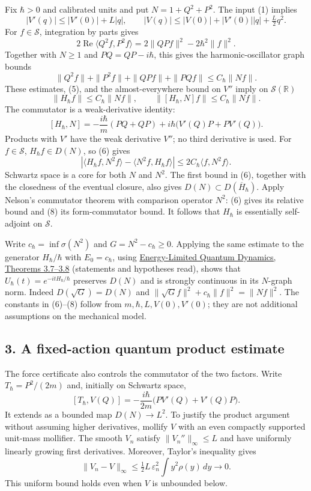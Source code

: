 \documentclass[11pt,a4paper]{article}
\begin{document}
Fix \(\hbar>0\) and calibrated units and put \(N=1+Q^2+P^2\). The input
(1) implies \[
 |V'(q)|\le |V'(0)|+L|q|,\qquad
 |V(q)|\le |V(0)|+|V'(0)||q|+\tfrac L2q^2.\tag{5}
\] For \(f\in\mathcal S\), integration by parts gives \[
 2\operatorname{Re}\langle Q^2f,P^2f\rangle
  =2\|QPf\|^2-2\hbar^2\|f\|^2.\tag{5a}
\] Together with \(N\ge1\) and \(PQ=QP-i\hbar\), this gives the
harmonic-oscillator graph bounds \[
 \|Q^2f\|+\|P^2f\|+\|QPf\|+\|PQf\|
 \le C_\hbar\|Nf\|.\tag{5b}
\] These estimates, (5), and the almost-everywhere bound on \(V''\)
imply on \(\mathcal S(\mathbb R)\) \[
 \|H_\hbar f\|\le C_\hbar\|Nf\|,\qquad
 \|[H_\hbar,N]f\|\le C_\hbar\|Nf\|.\tag{6}
\] The commutator is a weak-derivative identity: \[
 [H_\hbar,N]
 =-\frac{i\hbar}{m}(PQ+QP)
    +i\hbar\big(V'(Q)P+PV'(Q)\big).\tag{7}
\] Products with \(V'\) have the weak derivative \(V''\); no third
derivative is used. For \(f\in\mathcal S\), \(H_\hbar f\in D(N)\), so
(6) gives \[
 |\langle H_\hbar f,N^2f\rangle-\langle N^2f,H_\hbar f\rangle|
 \le2C_\hbar\langle f,N^2f\rangle.\tag{8}
\] Schwartz space is a core for both \(N\) and \(N^2\). The first bound
in (6), together with the closedness of the eventual closure, also gives
\(D(N)\subset D(\overline H_\hbar)\). Apply Nelson's commutator theorem
with comparison operator \(N^2\): (6) gives its relative bound and (8)
its form-commutator bound. It follows that \(H_\hbar\) is essentially
self-adjoint on \(\mathcal S\).

Write \(c_\hbar=\inf\sigma(N^2)\) and \(G=N^2-c_\hbar\ge0\). Applying
the same estimate to the generator \(H_\hbar/\hbar\) with
\(E_0=c_\hbar\), using
\href{https://link.springer.com/article/10.1007/s00220-025-05282-w}{Energy-Limited
Quantum Dynamics, Theorems 3.7--3.8} (statements and hypotheses read),
shows that \(U_\hbar(t)=e^{-itH_\hbar/\hbar}\) preserves \(D(N)\) and is
strongly continuous in its \(N\)-graph norm. Indeed \(D(\sqrt G)=D(N)\)
and \(\|\sqrt G f\|^2+c_\hbar\|f\|^2=\|Nf\|^2\). The constants in
(6)--(8) follow from \(m,\hbar,L,V(0),V'(0)\); they are not additional
assumptions on the mechanical model.

\subsection{3. A fixed-action quantum product
estimate}\label{a-fixed-action-quantum-product-estimate}

The force certificate also controls the commutator of the two factors.
Write \(T_\hbar=P^2/(2m)\) and, initially on Schwartz space,
\[[T_\hbar,V(Q)]
 =-\frac{i\hbar}{2m}\big(PV'(Q)+V'(Q)P\big).\tag{9}\] It extends as a
bounded map \(D(N)\to L^2\). To justify the product argument without
assuming higher derivatives, mollify \(V\) with an even compactly
supported unit-mass mollifier. The smooth \(V_n\) satisfy
\(\|V_n''\|_\infty\le L\) and have uniformly linearly growing first
derivatives. Moreover, Taylor's inequality gives \[\|V_n-V\|_\infty
 \le \tfrac12L\,\varepsilon_n^2
          \int y^2\rho(y)\,dy\longrightarrow0.\tag{10}\] This uniform
bound holds even when \(V\) is unbounded below.
\end{document}

